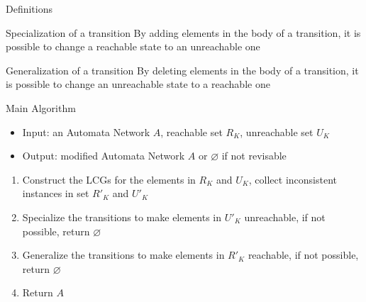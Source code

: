 \documentclass[8pt]{beamer}
\begin{document}
\begin{frame}{Definitions}
\begin{block}{Specialization of a transition}
By adding elements in the body of a transition, it is possible to change a reachable state to an unreachable one
\end{block}
\begin{block}{Generalization of a transition}
By deleting elements in the body of a transition, it is possible to change an unreachable state to a reachable one
\end{block}
\end{frame}

\begin{frame}{Main Algorithm}
    \begin{itemize}
        \item Input: an Automata Network $A$, reachable set $R_K$, unreachable set $U_K$
        \item Output: modified Automata Network $A$ or $\varnothing$ if not revisable
    \end{itemize}
    \begin{enumerate}
        \item Construct the LCGs for the elements in $R_K$ and $U_K$, collect inconsistent instances in set $R'_K$ and $U'_K$
        \item Specialize the transitions to make elements in $U'_K$ unreachable, if not possible, return $\varnothing$
        \item Generalize the transitions to make elements in $R'_K$ reachable, if not possible, return $\varnothing$
        \item Return $A$
    \end{enumerate}
\end{frame}
\end{document}
